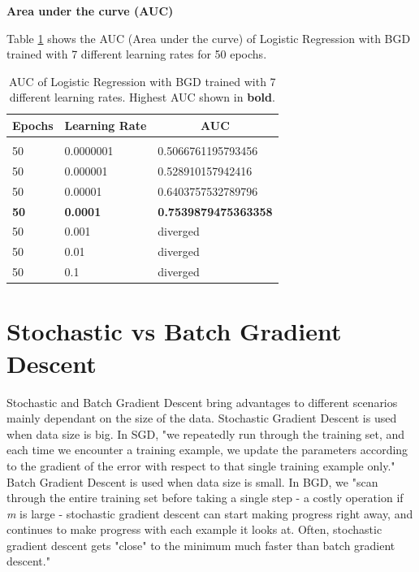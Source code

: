 \documentclass{article} %
\begin{document}
\textbf{Area under the curve (AUC)}

Table \ref{Table8} shows the AUC (Area under the curve) of Logistic Regression with BGD trained with 7 different learning rates for 50 epochs.

\begin{table}[!htbp]
\caption{AUC of Logistic Regression with BGD trained with 7 different learning rates. Highest AUC shown in \textbf{bold}.}
\label{Table8}
\begin{center}
\begin{tabular}{l l l}
\multicolumn{1}{c}{\bf Epochs} &\multicolumn{1}{c}{\bf Learning Rate} &\multicolumn{1}{c}{\bf AUC}
\\ \hline \\

50 & 0.0000001 & 0.5066761195793456\\
50 & 0.000001  & 0.528910157942416\\
50 & 0.00001   & 0.6403757532789796\\

\textbf{50} & \textbf{0.0001} & \textbf{0.7539879475363358}\\

50 & 0.001     & diverged\\
50 & 0.01      & diverged\\
50 & 0.1       & diverged\\

\end{tabular}
\end{center}
\end{table}

\section{Stochastic vs Batch Gradient Descent}

Stochastic and Batch Gradient Descent bring advantages to different scenarios mainly dependant on the size of the data. Stochastic Gradient Descent is used when data size is big. In SGD, "we repeatedly run through the training set, and each time we encounter a training example, we update the parameters according to the gradient of the error with respect to that single training example only." \cite{ng2000cs229} Batch Gradient Descent is used when data size is small. In BGD, we "scan through the entire training set before taking a single step - a costly operation if \textit{m} is large - stochastic gradient descent can start making progress right away, and continues to make progress with each example it looks at. Often, stochastic gradient descent gets \textit{\texttheta} "close" to the minimum much faster than batch gradient descent." \cite{ng2000cs229}
\end{document}
